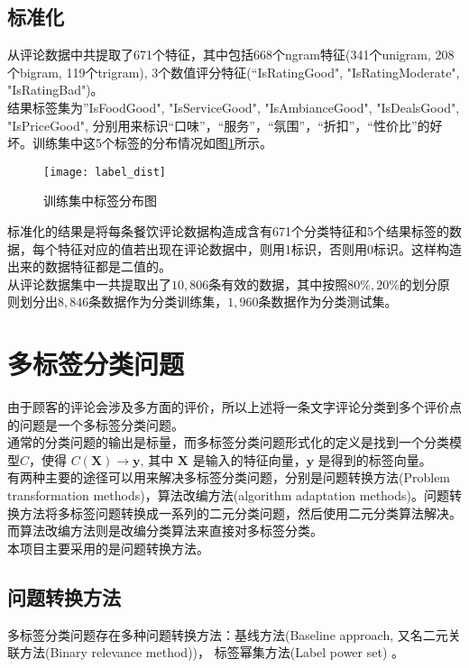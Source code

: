 \documentclass[a4paper, twocolumn]{article}
\begin{document}
\begin{CJK}{UTF8}{gbsn}
	\subsection{标准化}
	从评论数据中共提取了671个特征，其中包括668个ngram特征(341个unigram, 208个bigram, 119个trigram), 3个数值评分特征(“IsRatingGood", "IsRatingModerate", "IsRatingBad")。\\
	结果标签集为”IsFoodGood", "IsServiceGood", "IsAmbianceGood", "IsDealsGood", "IsPriceGood", 分别用来标识“口味”，“服务”，“氛围”，“折扣”，“性价比”的好坏。训练集中这5个标签的分布情况如图\ref{fig:label_dist}所示。
	\begin{figure}[h]
	\centering
	\texttt{[image: label\_dist]}
	\caption{训练集中标签分布图}
	\label{fig:label_dist}
	\end{figure}
	\newline
	标准化的结果是将每条餐饮评论数据构造成含有671个分类特征和5个结果标签的数据，每个特征对应的值若出现在评论数据中，则用1标识，否则用0标识。这样构造出来的数据特征都是二值的。\\
	从评论数据集中一共提取出了$10,806$条有效的数据，其中按照$ 80\%, 20\% $的划分原则划分出$8,846$条数据作为分类训练集，$1,960$条数据作为分类测试集。
	
	\section{多标签分类问题}
	由于顾客的评论会涉及多方面的评价，所以上述将一条文字评论分类到多个评价点的问题是一个多标签分类问题。\\
	通常的分类问题的输出是标量，而多标签分类问题形式化的定义是找到一个分类模型$ C $，使得 $ C(\textbf{X}) \rightarrow \textbf{y} $, 其中 $ \textbf{X} $ 是输入的特征向量，$ \textbf{y} $ 是得到的标签向量。\\
	有两种主要的途径可以用来解决多标签分类问题\cite{mlb}，分别是问题转换方法(Problem transformation methods)，算法改编方法(algorithm adaptation methods)。问题转换方法将多标签问题转换成一系列的二元分类问题，然后使用二元分类算法解决。而算法改编方法则是改编分类算法来直接对多标签分类。\\
	本项目主要采用的是问题转换方法。
	\subsection{问题转换方法}
	多标签分类问题存在多种问题转换方法：基线方法\cite{br}(Baseline approach, 又名二元关联方法(Binary relevance method))， 标签幂集方法\cite{mlb}(Label power set)	。

\end{CJK}
\end{document}

